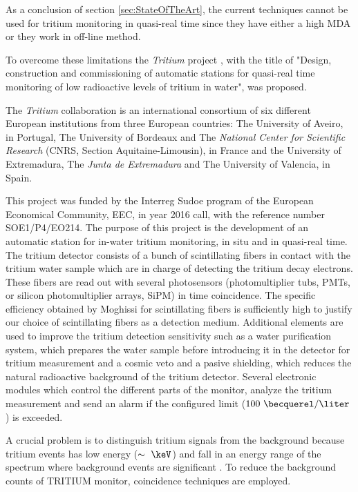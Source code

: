 As a conclusion of section \ref{sec:StateOfTheArt}, the current techniques cannot be used for tritium monitoring in quasi-real time since they have either a high MDA or they work in off-line method. 

To overcome these limitations the \textit{Tritium} project \cite{TRITIUM}, with the title of "Design, construction and commissioning of automatic stations for quasi-real time monitoring of low radioactive levels of tritium in water", was proposed.

The \textit{Tritium} collaboration is an international consortium of six different European institutions from three European countries: The University of Aveiro, in Portugal, The University of Bordeaux and The \textit{National Center for Scientific Research} (CNRS, Section Aquitaine-Limousin), in France and the University of Extremadura, The \textit{Junta de Extremadura} and The University of Valencia, in Spain.

This project was funded by the Interreg Sudoe program of the European Economical Community, EEC, in year 2016 call, with the reference number SOE1/P4/EO214. The purpose of this project is the development of an automatic station for in-water tritium monitoring, in situ and in quasi-real time. The tritium detector consists of a bunch of scintillating fibers in contact with the tritium water sample which are in charge of detecting the tritium decay electrons. These fibers are read out with several photosensors (photomultiplier tubs, PMTs, or silicon photomultiplier arrays, SiPM) in time coincidence. The specific efficiency obtained by Moghissi for scintillating fibers is sufficiently high to justify our choice of scintillating fibers as a detection medium. Additional elements are used to improve the tritium detection sensitivity such as a water purification system, which prepares the water sample before introducing it in the detector for tritium measurement and a cosmic veto and a pasive shielding, which reduces the natural radioactive background of the tritium detector. Several electronic modules which control the different parts of the monitor, analyze the tritium measurement and send an alarm if the configured limit ($100~\becquerel/\liter$) is exceeded.

A crucial problem is to distinguish tritium signals from the background because tritium events has low energy ($\sim~\keV$) and fall in an energy range of the spectrum where background events are significant . To reduce the background counts of TRITIUM monitor, coincidence techniques are employed.

